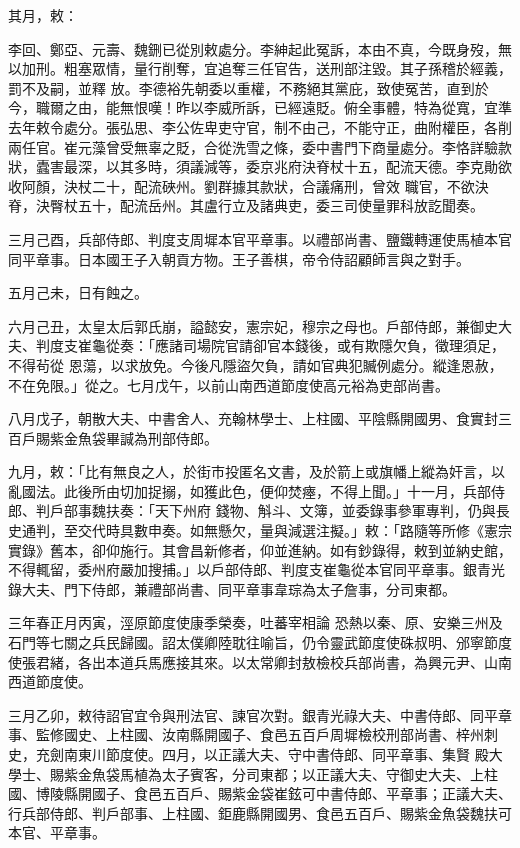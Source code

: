 \begin{pinyinscope}
 其月，敕：



 李回、鄭亞、元壽、魏鉶已從別敕處分。李紳起此冤訴，本由不真，今既身歿，無以加刑。粗塞眾情，量行削奪，宜追奪三任官告，送刑部注毀。其子孫稽於經義，罰不及嗣，並釋
 放。李德裕先朝委以重權，不務絕其黨庇，致使冤苦，直到於今，職爾之由，能無恨嘆！昨以李威所訴，已經遠貶。俯全事體，特為從寬，宜準去年敕令處分。張弘思、李公佐卑吏守官，制不由己，不能守正，曲附權臣，各削兩任官。崔元藻曾受無辜之貶，合從洗雪之條，委中書門下商量處分。李恪詳驗款狀，蠹害最深，以其多時，須議減等，委京兆府決脊杖十五，配流天德。李克勛欲收阿顏，決杖二十，配流硤州。劉群據其款狀，合議痛刑，曾效
 職官，不欲決脊，決臀杖五十，配流岳州。其盧行立及諸典吏，委三司使量罪科放訖聞奏。



 三月己酉，兵部侍郎、判度支周墀本官平章事。以禮部尚書、鹽鐵轉運使馬植本官同平章事。日本國王子入朝貢方物。王子善棋，帝令侍詔顧師言與之對手。



 五月己未，日有蝕之。



 六月己丑，太皇太后郭氏崩，謚懿安，憲宗妃，穆宗之母也。戶部侍郎，兼御史大夫、判度支崔龜從奏：「應諸司場院官請卻官本錢後，或有欺隱欠負，徵理須足，不得茍從
 恩蕩，以求放免。今後凡隱盜欠負，請如官典犯贓例處分。縱逢恩赦，不在免限。」從之。七月戊午，以前山南西道節度使高元裕為吏部尚書。



 八月戊子，朝散大夫、中書舍人、充翰林學士、上柱國、平陰縣開國男、食實封三百戶賜紫金魚袋畢諴為刑部侍郎。



 九月，敕：「比有無良之人，於街市投匿名文書，及於箭上或旗幡上縱為奸言，以亂國法。此後所由切加捉搦，如獲此色，便仰焚瘞，不得上聞。」十一月，兵部侍郎、判戶部事魏扶奏：「天下州府
 錢物、斛斗、文簿，並委錄事參軍專判，仍與長史通判，至交代時具數申奏。如無懸欠，量與減選注擬。」敕：「路隨等所修《憲宗實錄》舊本，卻仰施行。其會昌新修者，仰並進納。如有鈔錄得，敕到並納史館，不得輒留，委州府嚴加搜捕。」以戶部侍郎、判度支崔龜從本官同平章事。銀青光錄大夫、門下侍郎，兼禮部尚書、同平章事韋琮為太子詹事，分司東都。



 三年春正月丙寅，涇原節度使康季榮奏，吐蕃宰相論
 恐熱以秦、原、安樂三州及石門等七關之兵民歸國。詔太僕卿陸耽往喻旨，仍令靈武節度使硃叔明、邠寧節度使張君緒，各出本道兵馬應接其來。以太常卿封敖檢校兵部尚書，為興元尹、山南西道節度使。



 三月乙卯，敕待詔官宜令與刑法官、諫官次對。銀青光祿大夫、中書侍郎、同平章事、監修國史、上柱國、汝南縣開國子、食邑五百戶周墀檢校刑部尚書、梓州刺史，充劍南東川節度使。四月，以正議大夫、守中書侍郎、同平章事、集賢
 殿大學士、賜紫金魚袋馬植為太子賓客，分司東都；以正議大夫、守御史大夫、上柱國、博陵縣開國子、食邑五百戶、賜紫金袋崔鉉可中書侍郎、平章事；正議大夫、行兵部侍郎、判戶部事、上柱國、鉅鹿縣開國男、食邑五百戶、賜紫金魚袋魏扶可本官、平章事。




\end{pinyinscope}
